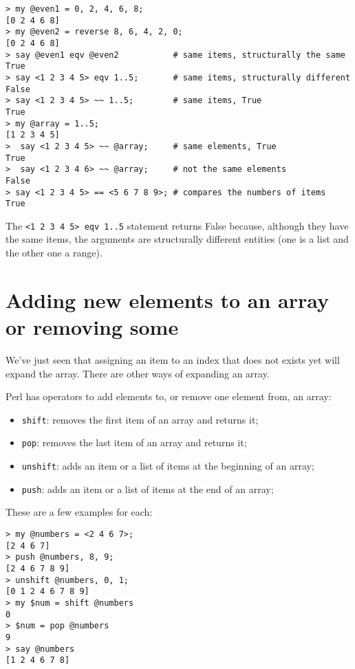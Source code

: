 \begin{verbatim}
> my @even1 = 0, 2, 4, 6, 8;
[0 2 4 6 8]
> my @even2 = reverse 8, 6, 4, 2, 0;
[0 2 4 6 8]
> say @even1 eqv @even2           # same items, structurally the same
True
> say <1 2 3 4 5> eqv 1..5;       # same items, structurally different
False
> say <1 2 3 4 5> ~~ 1..5;        # same items, True
True
> my @array = 1..5;               
[1 2 3 4 5]
>  say <1 2 3 4 5> ~~ @array;     # same elements, True
True
>  say <1 2 3 4 6> ~~ @array;     # not the same elements
False
> say <1 2 3 4 5> == <5 6 7 8 9>; # compares the numbers of items
True
\end{verbatim}

The \verb'<1 2 3 4 5> eqv 1..5' statement returns False because, 
although they have the same items, the arguments are structurally 
different entities (one is a list and the other one a range).

\section{Adding new elements to an array or removing some}

We've just seen that assigning an item to an index that does 
not exists yet will expand the array. There are other 
ways of expanding an array.

Perl has operators to add elements to, or remove one element 
from, an array:

\begin{itemize}
\item {\tt shift}: removes the first item of an array and returns it;
\item {\tt pop}: removes the last item of an array and returns it;
\item {\tt unshift}: adds an item or a list of items at the 
beginning of an array;
\item {\tt push}: adds an item or a list of items at the 
end of an array;
\end{itemize}

These are a few examples for each:

\begin{verbatim}
> my @numbers = <2 4 6 7>;
[2 4 6 7]
> push @numbers, 8, 9;
[2 4 6 7 8 9]
> unshift @numbers, 0, 1;
[0 1 2 4 6 7 8 9]
> my $num = shift @numbers
0
> $num = pop @numbers
9
> say @numbers
[1 2 4 6 7 8]
\end{verbatim}

